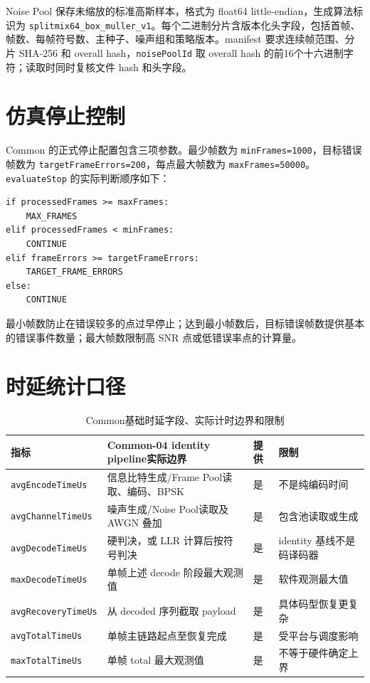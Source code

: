 Noise Pool 保存未缩放的标准高斯样本，格式为 float64 little-endian，生成算法标识为 \texttt{splitmix64\_box\_muller\_v1}。每个二进制分片含版本化头字段，包括首帧、帧数、每帧符号数、主种子、噪声组和策略版本。manifest 要求连续帧范围、分片 SHA-256 和 overall hash，\texttt{noisePoolId} 取 overall hash 的前16个十六进制字符；读取时同时复核文件 hash 和头字段。

\section{仿真停止控制}

Common 的正式停止配置包含三项参数。最少帧数为 \texttt{minFrames=1000}，目标错误帧数为 \texttt{targetFrameErrors=200}，每点最大帧数为 \texttt{maxFrames=50000}。\texttt{evaluateStop} 的实际判断顺序如下：

\begin{verbatim}
if processedFrames >= maxFrames:
    MAX_FRAMES
elif processedFrames < minFrames:
    CONTINUE
elif frameErrors >= targetFrameErrors:
    TARGET_FRAME_ERRORS
else:
    CONTINUE
\end{verbatim}

最小帧数防止在错误较多的点过早停止；达到最小帧数后，目标错误帧数提供基本的错误事件数量；最大帧数限制高 SNR 点或低错误率点的计算量。

\section{时延统计口径}

\begin{table}[htbp]
  \centering
  \scriptsize
  \caption{Common基础时延字段、实际计时边界和限制}
  \label{tab:common-latency-fields}
  \begin{tabular}{p{}p{}p{}p{}}
    \toprule
    指标 & Common-04 identity pipeline实际边界 & 提供 & 限制 \\
    \midrule
    \texttt{avgEncodeTimeUs} & 信息比特生成/Frame Pool读取、编码、BPSK & 是 & 不是纯编码时间 \\
    \texttt{avgChannelTimeUs} & 噪声生成/Noise Pool读取及 AWGN 叠加 & 是 & 包含池读取或生成 \\
    \texttt{avgDecodeTimeUs} & 硬判决，或 LLR 计算后按符号判决 & 是 & identity 基线不是码译码器 \\
    \texttt{maxDecodeTimeUs} & 单帧上述 decode 阶段最大观测值 & 是 & 软件观测最大值 \\
    \texttt{avgRecoveryTimeUs} & 从 decoded 序列截取 payload & 是 & 具体码型恢复更复杂 \\
    \texttt{avgTotalTimeUs} & 单帧主链路起点至恢复完成 & 是 & 受平台与调度影响 \\
    \texttt{maxTotalTimeUs} & 单帧 total 最大观测值 & 是 & 不等于硬件确定上界 \\
    \bottomrule
  \end{tabular}
\end{table}

